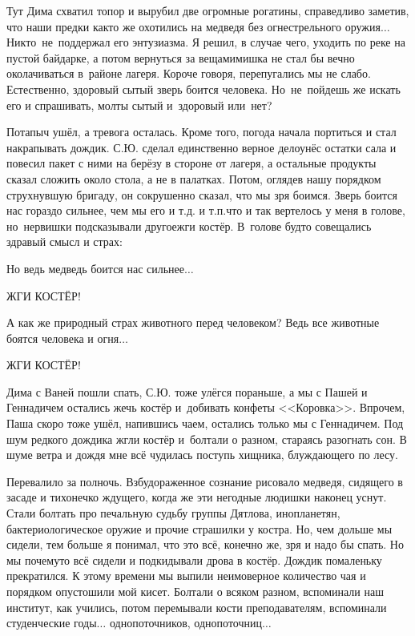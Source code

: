 Тут Дима схватил топор и вырубил две огромные рогатины, справедливо заметив, что наши предки как\sdash то же охотились на медведя без огнестрельного оружия$\ldots$ Никто~не~поддержал его энтузиазма. Я решил, в случае чего, уходить по реке на пустой байдарке, а потом вернуться за вещами\mdash мишка не стал бы вечно околачиваться в~районе лагеря. Короче говоря, перепугались мы не слабо. Естественно, здоровый сытый зверь боится человека. Но~не~пойдешь же искать его и спрашивать, мол\mdash ты сытый и~здоровый или~нет? 

Потапыч ушёл, а тревога осталась. Кроме того, погода начала портиться и стал накрапывать дождик. С.Ю. сделал единственно верное дело\mdash унёс остатки сала и повесил пакет с ними на берёзу в стороне от лагеря, а остальные продукты сказал сложить около стола, а не в палатках. Потом, оглядев нашу порядком струхнувшую бригаду, он сокрушенно сказал, что мы зря боимся. Зверь боится нас гораздо сильнее, чем мы его и т.д. и т.п.\mdash что и так вертелось у меня в голове, но~нервишки подсказывали другое\mdash жги костёр. В~голове будто совещались здравый смысл и страх:

\diagdash Но ведь медведь боится нас сильнее$\ldots$  

\diagdash ЖГИ КОСТЁР! 

\diagdash А как же природный страх животного перед человеком? Ведь все животные боятся человека и огня$\ldots$  

\diagdash Ж\sdash Г\sdash И \enspace К\sdash О\sdash С\sdash Т\sdash Ё\sdash Р!

Дима с Ваней пошли спать, С.Ю. тоже улёгся пораньше, а мы с Пашей и Геннадичем остались жечь костёр и~добивать конфеты <<Коровка>>. Впрочем, Паша скоро тоже ушёл, напившись чаем, остались только мы с Геннадичем. Под шум редкого дождика жгли костёр и~болтали о разном, стараясь разогнать сон. В шуме ветра и дождя мне всё чудилась поступь хищника, блуждающего по лесу. 

Перевалило за полночь. Взбудораженное сознание рисовало медведя, сидящего в засаде и тихонечко ждущего, когда же эти негодные людишки наконец уснут. Стали болтать про печальную судьбу группы Дятлова, инопланетян, бактериологическое оружие и прочие страшилки у костра. Но, чем дольше мы сидели, тем больше я понимал, что это всё, конечно же, зря и надо бы спать. Но мы почему\sdash то всё сидели и подкидывали дрова в костёр. Дождик помаленьку прекратился. К этому времени мы выпили неимоверное количество чая и порядком опустошили мой кисет. Болтали о всяком разном, вспоминали наш институт, как учились, потом перемывали кости преподавателям, вспоминали студенческие годы$\ldots$ однопоточников, однопоточниц$\ldots$ %

